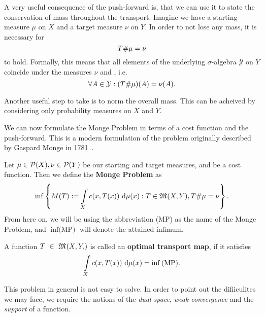 A very useful consequence of the push-forward is, that we can use it to state the conservation of mass throughout the transport. Imagine we have a starting measure $\mu$ on $X$ and a target measure $\nu$ on $Y$. In order to not lose any mass, it is necessary for
\[ {T} \# \mu = \nu \]
to hold. Formally, this means that all elements of the underlying $\sigma$-algebra $\mathcal{Y}$ on $Y$ coincide under the measures $\nu$ and \push{\mu}, i.e.
\[ \forall A \in \mathcal{Y}: ({T} \# \mu)(A) = \nu(A).\]

Another useful step to take is to norm the overall mass. This can be acheived by considering only probability measures on $X$ and $Y$.

We can now formulate the Monge Problem in terms of a cost function and the push-forward. This is a modern formulation of the problem originally described by Gaspard Monge in 1781~\cite{Mon1781}.

\begin{definition}\label{MongeProb}
	Let $\mu \in \mathcal{P}(X), \nu \in \mathcal{P}(Y)$ be our starting and target measures, and  be a cost function. Then we define the \textbf{Monge Problem} as
	\begin{equation}\label{MP}
		\inf \left\{ M(T) := \int\limits_X c(x, T(x))~\text{\normalfont{}d}{\mu}({x}) : T \in \mathfrak{M}_{}(X, Y), {T} \# \mu = \nu \right\}.
	\end{equation}
	From here on, we will be using the abbreviation (MP) as the name of the Monge Problem, and $\inf \text{(MP)}$ will denote the attained infimum.
\end{definition}

\begin{definition}\label{OTM}
	A function $T~\in~\MF{X, Y}$ is called an \textbf{optimal transport map}, if it satisfies
	\[ \int\limits_X c(x, T(x))~\text{\normalfont{}d}{\mu}({x}) = \inf \text{(MP)}. \]
\end{definition}

This problem in general is not easy to solve. In order to point out the difiiculites we may face, we require the notions of the \textit{dual space}, \textit{weak convergence} and the \textit{support} of a function.


